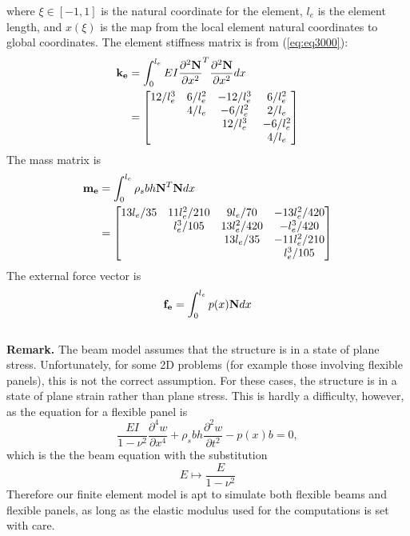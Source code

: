 \documentclass{article}
\begin{document}
where $\xi \in [-1,1]$ is the natural coordinate for the element, $l_e$ is the element length, and $x(\xi)$ is the map from the local element natural coordinates to global coordinates.
The element stiffness matrix is from (\ref{eq:eq3000}):
\begin{equation}
\begin{aligned}
{\bf k_e} &= \int_0^{l_e} EI \frac{\partial^2 {\bf N}}{\partial x^2}^T \frac{\partial^2 {\bf N}}{\partial x^2} dx  \\
&=\begin{bmatrix}
12/l_e^3 & 6/l_e^2 & -12/l_e^3 & 6/l_e^2 \\
         & 4/l_e   & -6/l_e^2  & 2/l_e   \\
         &         & 12/l_e^3  &-6/l_e^2 \\
         &         &           &4/l_e
\end{bmatrix}
\end{aligned}
\label{eq:eq5000}
\end{equation}
The mass matrix is
\begin{equation}
\begin{aligned}
{\bf m_e}&=\int_0^{l_e} \rho_s b h {\bf N}^T {\bf N} dx  \\
&= \begin{bmatrix}
13l_e/35 & 11l_e^2/210 & 9l_e/70      & -13l_e^2/420 \\
         & l_e^3/105   & 13l_e^2/420  & -l_e^3/420   \\
         &             & 13l_e/35     & -11l_e^2/210 \\
         &             &              & l_e^3/105
\end{bmatrix}
\end{aligned}
\label{eq:eq5100}
\end{equation}
The external force vector is
\begin{equation}
{\bf f_e}=\int_0^{l_e} p(x) {\bf N} dx
\label{eq:eq5200}
\end{equation} \\
{\bf Remark. } The beam model assumes that the structure is in a state of plane stress.
Unfortunately, for some 2D problems (for example those involving flexible panels), this is not the correct assumption. 
For these cases, the structure is in a state of plane strain rather than plane stress. 
This is hardly a difficulty, however, as the equation for a flexible panel is
\[ \frac{EI}{1-\nu^2}\frac{\partial^4 w}{\partial x^4}+\rho_s b h \frac{\partial ^2 w}{\partial t^2}-p(x)b=0, \]
which is the the beam equation with the substitution
\[ E \mapsto \frac{E}{1-\nu^2} \]
Therefore our finite element model is apt to simulate both flexible beams and flexible panels,  as long as the elastic modulus used for the computations is set with care.
\end{document}
